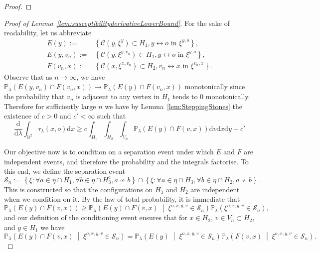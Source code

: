 \documentclass[10pt,a4paper,dvipsnames]{article}
\theoremstyle{definition}
\theoremstyle{remark}
\newcommand{\pla}{\mathbb P_\lambda}
\newcommand{\Scal}{\mathcal{S}}
\newcommand{\HypTwo}{{\mathbb{H}^2}}
\newcommand{\dd}{\mathrm{d}} %
\newcommand{\C}{\mathscr {C}}
\newcommand{\conn}[3]{#1 \longleftrightarrow #2\textrm { in } #3}
\newcommand{\tlam}{\tau_\lambda}
\newcommand{\orig}{o}
\numberwithin{equation}{section}
\begin{document}
\begin{proof}
\end{proof}


\begin{proof}[Proof of Lemma~\ref{lem:susceptibilityderivativeLowerBound}]
For the sake of readability, let us abbreviate
\begin{align}
    E(y):=&\left\{\C\left(y,\xi^{y}\right)\subset  H_1, \conn{y}{\orig}{\xi^{y,\orig}}\right\}, \\
    E(y,v_n):=&\left\{\C\left(y,\xi^{y,v_n}\right)\subset  H_1, \conn{y}{\orig}{\xi^{y,\orig}}\right\}, \\
    F(v_n,x):=&\left\{\C\left(x,\xi^{x,v_n}\right)\subset  H_2,\conn{v_n}{x}{\xi^{v_n,x}}\right\}.
\end{align}
Observe that as $n\to\infty$, we have $\pla\left(E(y,v_n)\cap F(v_n,x)\right) \to \pla\left(E(y)\cap F(v_n,x)\right)$ monotonically since the probability that $v_n$ is adjacent to any vertex in $ H_1$ tends to $0$ monotonically. Therefore for sufficiently large $n$ we have by Lemma~\ref{lem:SteppingStones} the existence of $c>0$ and $c'<\infty$ such that
\begin{equation}
    \frac{\dd}{\dd \lambda}\int_{\HypTwo}\tlam\left(x,\orig\right)\dd x \geq c\int_{H_1}\int_{H_2}\int_{V_n}\pla\left(E(y)\cap F(v,x)\right)\dd v \dd x \dd y - c'
\end{equation}

Our objective now is to condition on a separation event under which $E$ and $F$ are independent events, and therefore the probability and the integrals factorise. 
To this end, we define the separation event
\begin{equation}\label{eq:DefSn}
        \Scal_n := \left\{\xi\colon \forall a\in\eta\cap H_1, \forall b\in\eta\cap H_3^\mathrm{c}, a\not\sim b\right\}\cap\left\{\xi\colon \forall a\in\eta\cap H_3, \forall b\in\eta\cap H_2, a\not\sim b\right\}.
    \end{equation}
    This is constructed so that the configurations on $H_1$ and $H_2$ are independent when we condition on it. 
    By the law of total probability, it is immediate that
    \begin{equation}
    \label{eqn:conditioning}
        \pla\left(E(y)\cap F(v,x)\right) \geq \pla\left(E(y)\cap F(v,x)\;\middle|\;\xi^{\orig,x,y,v}\in\Scal_n\right)\pla\left(\xi^{\orig,x,y,v}\in\Scal_n\right),
    \end{equation}
    and our definition of the conditioning event ensures that for $x\in H_2$, $v\in V_n\subset H_2$, and $y\in H_1$ we have
    \begin{equation}\label{eq:FactorizedLowerBd}
        \pla\left(E(y)\cap F(v,x)\;\middle|\;\xi^{\orig,x,y,v}\in\Scal_n\right) = \pla\left(E(y)\;\middle|\;\xi^{\orig,x,y,v}\in\Scal_n\right)\pla\left(F(v,x)\;\middle|\;\xi^{\orig,x,y,v}\in\Scal_n\right).
    \end{equation}


\end{proof}
\end{document}
